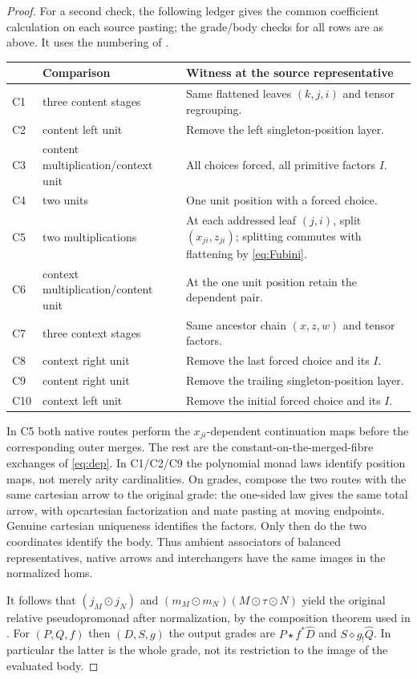 \documentclass[11pt]{article}
\theoremstyle{definition}
\newcommand{\St}{\mathbin{\star}}
\begin{document}
\begin{proof}
For a second check, the following ledger gives the common coefficient
calculation on each source pasting; the grade/body checks for all rows
are as above. It uses the numbering of \cite[Def.~4.1, App.~A]{GL}.
\begin{center}\small
\begin{tabular}{@{}llp{.55\linewidth}@{}}
\toprule
& Comparison & Witness at the source representative\\
\midrule
C1&three content stages&Same flattened leaves $(k,j,i)$ and tensor regrouping.\\
C2&content left unit&Remove the left singleton-position layer.\\
C3&content multiplication/context unit&All choices forced, all primitive factors $I$.\\
C4&two units&One unit position with a forced choice.\\
C5&two multiplications&At each addressed leaf $(j,i)$, split $(x_{ji},z_{ji})$; splitting commutes with flattening by \eqref{eq:Fubini}.\\
C6&context multiplication/content unit&At the one unit position retain the dependent pair.\\
C7&three context stages&Same ancestor chain $(x,z,w)$ and tensor factors.\\
C8&context right unit&Remove the last forced choice and its $I$.\\
C9&content right unit&Remove the trailing singleton-position layer.\\
C10&context left unit&Remove the initial forced choice and its $I$.\\
\bottomrule
\end{tabular}\end{center}
In C5 both native routes perform the $x_{ji}$-dependent continuation
maps before the corresponding outer merges. The rest are the
constant-on-the-merged-fibre exchanges of \eqref{eq:dep}. In C1/C2/C9
the polynomial monad laws identify position maps, not merely arity
cardinalities. On grades, compose the two routes with the same
cartesian arrow to the original grade: the one-sided law gives the
same total arrow, with opcartesian factorization and mate pasting at
moving endpoints. Genuine cartesian uniqueness identifies the factors.
Only then do the two coordinates identify the body. Thus ambient
associators of balanced representatives, native arrows and interchangers
have the same images in the normalized homs.

It follows that $(j_M\odot j_N)$ and
$(m_M\odot m_N)(M\odot\tau\odot N)$ yield the original relative
pseudopromonad after normalization, by the composition theorem used
in \cite[section on mixed algebra]{U}. For $(P,Q,f)$ then $(D,S,g)$
the output grades are $P\St f^*\widehat D$ and
$S\diamond g_!\widehat Q$. In particular the latter is the whole grade,
not its restriction to the image of the evaluated body.
\end{proof}
\end{document}
